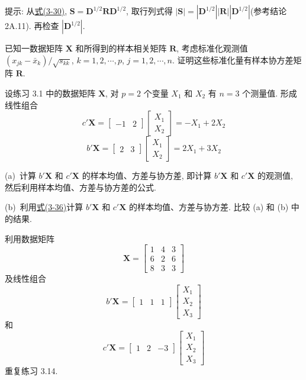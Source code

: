 提示: 从\hyperref[eq:3-30]{式(3-30)}, $\mathbf{S}=\mathbf{D}^{1/2}\mathbf{R}\mathbf{D}^{1/2}$, 取行列式得 $|\mathbf{S}|=|\mathbf{D}^{1/2}||\mathbf{R}||\mathbf{D}^{1/2}|$(参考结论 2A.11). 再检查 $|\mathbf{D}^{1/2}|$.

\quad 已知一数据矩阵 $\mathbf{X}$ 和所得到的样本相关矩阵 $\mathbf{R}$, 考虑标准化观测值 $(x_{jk}-\bar{x}_k)/\sqrt{s_{kk}}$, $k=1,2,\cdots,p$, $j=1,2,\cdots,n$. 证明这些标准化量有样本协方差矩阵 $\mathbf{R}$.

\quad 设练习 3.1 中的数据矩阵 $\mathbf{X}$, 对 $p=2$ 个变量 $X_1$ 和 $X_2$ 有 $n=3$ 个测量值. 形成线性组合
\[
c'\mathbf{X}=\begin{bmatrix}-1&2\end{bmatrix}\begin{bmatrix}X_1\\X_2\end{bmatrix}=-X_1+2X_2
\]
\[
b'\mathbf{X}=\begin{bmatrix}2&3\end{bmatrix}\begin{bmatrix}X_1\\X_2\end{bmatrix}=2X_1+3X_2
\]

(a)\ 计算 $b'\mathbf{X}$ 和 $c'\mathbf{X}$ 的样本均值、方差与协方差, 即计算 $b'\mathbf{X}$ 和 $c'\mathbf{X}$ 的观测值, 然后利用样本均值、方差与协方差的公式.

(b)\ 利用\hyperref[eq:3-36]{式(3-36)}计算 $b'\mathbf{X}$ 和 $c'\mathbf{X}$ 的样本均值、方差与协方差. 比较 (a) 和 (b) 中的结果.

\quad 利用数据矩阵
\[
\mathbf{X}=\begin{bmatrix}
1&4&3\\
6&2&6\\
8&3&3
\end{bmatrix}
\]
及线性组合
\[
b'\mathbf{X}=\begin{bmatrix}1&1&1\end{bmatrix}\begin{bmatrix}X_1\\X_2\\X_3\end{bmatrix}
\]
和
\[
c'\mathbf{X}=\begin{bmatrix}1&2&-3\end{bmatrix}\begin{bmatrix}X_1\\X_2\\X_3\end{bmatrix}
\]
重复练习 3.14.

